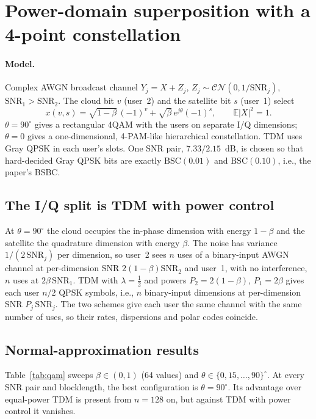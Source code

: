 \documentclass[11pt]{article}
\begin{document}
\section{Power-domain superposition with a 4-point constellation}\label{sec:qam}
\paragraph{Model.} Complex AWGN broadcast channel $Y_j=X+Z_j$, $Z_j\sim\mathcal{CN}(0,1/\mathrm{SNR}_j)$, $\mathrm{SNR}_1>\mathrm{SNR}_2$. The cloud bit $v$ (user~2) and the satellite bit $s$ (user~1) select
\[
x(v,s)=\sqrt{1-\beta}\,(-1)^v+\sqrt{\beta}\,e^{j\theta}(-1)^s,\qquad \mathbb E|X|^2=1 .
\]
$\theta=90^\circ$ gives a rectangular 4QAM with the users on separate I/Q dimensions; $\theta=0$ gives a one-dimensional, 4-PAM-like hierarchical constellation. TDM uses Gray QPSK in each user's slots. One SNR pair, $7.33/2.15$~dB, is chosen so that hard-decided Gray QPSK bits are exactly $\mathrm{BSC}(0.01)$ and $\mathrm{BSC}(0.10)$, i.e., the paper's BSBC.

\subsection{The I/Q split is TDM with power control}\label{sec:equiv}
At $\theta=90^\circ$ the cloud occupies the in-phase dimension with energy $1-\beta$ and the satellite the quadrature dimension with energy $\beta$. The noise has variance $1/(2\,\mathrm{SNR}_j)$ per dimension, so user~2 sees $n$ uses of a binary-input AWGN channel at per-dimension SNR $2(1-\beta)\mathrm{SNR}_2$ and user~1, with no interference, $n$ uses at $2\beta\,\mathrm{SNR}_1$. TDM with $\lambda=\frac12$ and powers $P_2=2(1-\beta)$, $P_1=2\beta$ gives each user $n/2$ QPSK symbols, i.e., $n$ binary-input dimensions at per-dimension SNR $P_j\,\mathrm{SNR}_j$. The two schemes give each user the same channel with the same number of uses, so their rates, dispersions and polar codes coincide.

\subsection{Normal-approximation results}
Table~\ref{tab:qam} sweeps $\beta\in(0,1)$ (64 values) and $\theta\in\{0,15,\dots,90\}^\circ$. At every SNR pair and blocklength, the best configuration is $\theta=90^\circ$. Its advantage over equal-power TDM is present from $n=128$ on, but against TDM with power control it vanishes.
\end{document}
